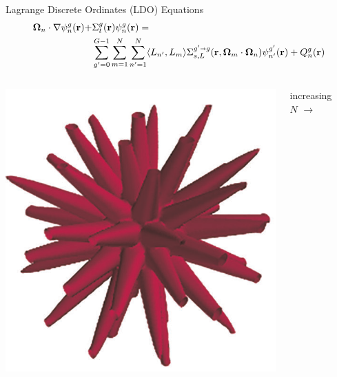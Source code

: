 \documentclass{beamer}
\newcommand{\bo}{\mathbf\Omega}
\newcommand{\vecr}{\textbf{r}}
\newcommand{\sa}{\shortrightarrow}
\begin{document}
\begin{frame}{Lagrange Discrete Ordinates (LDO) Equations \nocite{ahrens}}
%
\vspace{-2em}
\begin{align*}
\bo_n\cdot\nabla\psi_{n}^g(\vecr) + 
&\Sigma_{t}^g(\vecr)\psi_{n}^g(\vecr) = \\
&\sum_{g'=0}^{G-1}\sum_{m=1}^{N}\sum_{n'=1}^{N}\langle L_{n'},L_{m}\rangle
\Sigma_{s,L}^{g'\sa g}(\vecr,\bo_{m}\cdot\bo_n)\psi_{n'}^{g'}(\vecr)
+ Q_{n}^g(\vecr)
\end{align*}
%
\pause
%
\begin{columns}
\begin{column}{0.4\textwidth}
\includegraphics[width=\textwidth,natwidth=573,natheight=601]{img/ray-effects-ldo.png}
\end{column}
\pause
\begin{column}{0.2\textwidth}
\center\large increasing $N$
\vspace{-1.5em}
\center\Huge$\rightarrow$
\end{column}
\begin{column}{0.4\textwidth}

\end{column}
\end{columns}
\end{frame}
\end{document}
